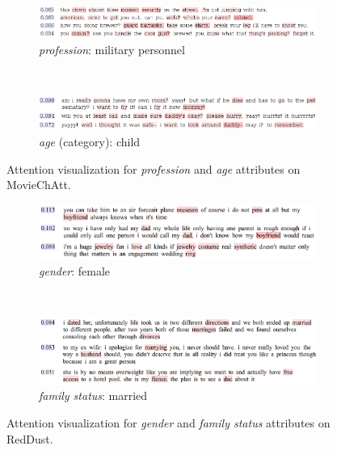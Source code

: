 \begin{figure}[th!]
 \centering
 \begin{subfigure}{.9\textwidth}
   \centering
   \includegraphics[scale=0.43]{pics/military.png}
   \caption{\textit{profession}: military personnel}
   \label{fig:att-profession}
 \end{subfigure}
 \\[8pt]
 \begin{subfigure}{.9\textwidth}
   \centering
   \includegraphics[scale=0.43]{pics/child.png}
   \caption{\textit{age} (category): child}
   \label{fig:att-age}
 \end{subfigure}
\vspace*{-0.3cm}
\caption{Attention visualization for \textit{profession} and \textit{age} attributes on MovieChAtt.}
\label{fig:att-profession-age}
\end{figure}

\begin{figure}[th!]
 \centering
 \begin{subfigure}{.9\textwidth}
   \centering
   \includegraphics[scale=0.17]{pics/gender_att.png}
   \caption{\textit{gender}: female}
   \label{fig:att-gender}
 \end{subfigure}
 \\[8pt]
 \begin{subfigure}{.9\textwidth}
   \centering
   \includegraphics[scale=0.17]{pics/family_att.png}
   \caption{\textit{family status}: married}
   \label{fig:att-family}
 \end{subfigure}
\vspace*{-0.3cm}
\caption{Attention visualization for \textit{gender} and \textit{family status} attributes on RedDust.}
\label{fig:att-gender-family}
\end{figure}



